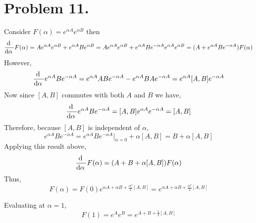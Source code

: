 \documentclass[12pt]{extarticle}
\begin{document}
\section*{Problem 11.}

Consider $F(\alpha) = e^{\alpha A} e^{\alpha B}$ then 
\[\frac{\mathrm{d} \:}{\mathrm{d}\alpha \:} F(\alpha) = A e^{\alpha A} e^{\alpha B} +  e^{\alpha A} B e^{\alpha B} = A e^{\alpha A} e^{\alpha B} +  e^{\alpha A} B e^{-\alpha A}  e^{\alpha A} e^{\alpha B} = (A + e^{\alpha A} B e^{-\alpha A})F(\alpha)\]
However, \[\frac{\mathrm{d} \:}{\mathrm{d}\alpha \:} e^{\alpha A} B e^{-\alpha A} = e^{\alpha A} A B e^{-\alpha A} - e^{\alpha A} BA e^{-\alpha A} = e^{\alpha A} [A, B] e^{-\alpha A}\]
Now since $[A, B]$ commutes with both $A$ and $B$ we have,
\[ \frac{\mathrm{d} \:}{\mathrm{d}\alpha \:} e^{\alpha A} B e^{-\alpha A} = [A, B] e^{\alpha A} e^{-\alpha A} = [A, B]\]
Therefore, because $[A, B]$ is independent of $\alpha$,
\[e^{\alpha A} B e^{-\alpha A} =  e^{\alpha A} B e^{-\alpha A} \big|_{\alpha = 0}   + \alpha [A, B] = B + \alpha [A, B] \]
Applying this result above, 
\[ \frac{\mathrm{d} \:}{\mathrm{d}\alpha \:} F(\alpha) = (A + B + \alpha [A, B])F(\alpha) \]
Thus,
\[ F(\alpha) = F(0) e^{\alpha A + \alpha B + \frac{\alpha^2}{2} [A, B]} = e^{\alpha A + \alpha B + \frac{\alpha^2}{2} [A, B]}\]

Evaluating at $\alpha = 1$, 
\[F(1) = e^A e^B = e^{A + B + \frac{1}{2} [A, B]}\]
\end{document}
